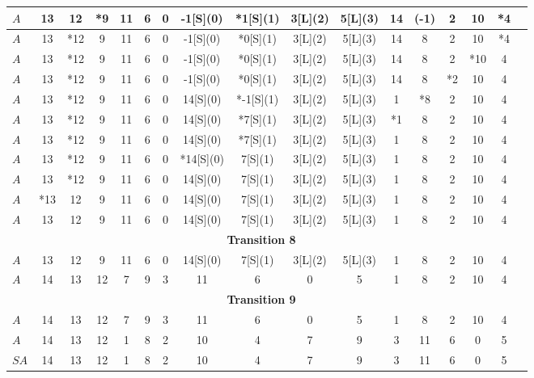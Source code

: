 \begin{center}
{\begin{tabular}{ | l | c | c | c | c | c | c | c | c | c | c | c | c | c | c | c | c | }
                $A$  & 13 & 12 & *9 & 11 & 6 & 0 & -1[S](0) & *1[S](1) & 3[L](2) & 5[L](3) & 14 & (-1) & 2 & 10 & *4  \\ \hline
                $A$  & 13 & *12 & 9 & 11 & 6 & 0 & -1[S](0) & *0[S](1) & 3[L](2) & 5[L](3) & 14 & 8 & 2 & 10 & *4  \\ \hline
                $A$  & 13 & *12 & 9 & 11 & 6 & 0 & -1[S](0) & *0[S](1) & 3[L](2) & 5[L](3) & 14 & 8 & 2 & *10 & 4  \\ \hline
                $A$  & 13 & *12 & 9 & 11 & 6 & 0 & -1[S](0) & *0[S](1) & 3[L](2) & 5[L](3) & 14 & 8 & *2 & 10 & 4  \\ \hline
                $A$  & 13 & *12 & 9 & 11 & 6 & 0 & 14[S](0) & *-1[S](1) & 3[L](2) & 5[L](3) & 1 & *8 & 2 & 10 & 4  \\ \hline
                $A$  & 13 & *12 & 9 & 11 & 6 & 0 & 14[S](0) & *7[S](1) & 3[L](2) & 5[L](3) & *1 & 8 & 2 & 10 & 4  \\ \hline
                $A$  & 13 & *12 & 9 & 11 & 6 & 0 & 14[S](0) & *7[S](1) & 3[L](2) & 5[L](3) & 1 & 8 & 2 & 10 & 4  \\ \hline
                $A$  & 13 & *12 & 9 & 11 & 6 & 0 & *14[S](0) & 7[S](1) & 3[L](2) & 5[L](3) & 1 & 8 & 2 & 10 & 4  \\ \hline
                $A$  & 13 & *12 & 9 & 11 & 6 & 0 & 14[S](0) & 7[S](1) & 3[L](2) & 5[L](3) & 1 & 8 & 2 & 10 & 4  \\ \hline
                $A$  & *13 & 12 & 9 & 11 & 6 & 0 & 14[S](0) & 7[S](1) & 3[L](2) & 5[L](3) & 1 & 8 & 2 & 10 & 4  \\ \hline
                $A$  & 13 & 12 & 9 & 11 & 6 & 0 & 14[S](0) & 7[S](1) & 3[L](2) & 5[L](3) & 1 & 8 & 2 & 10 & 4  \\ \hline
                \multicolumn{16}{c}{\textbf{Transition 8}}\\
                \hline
                $A$  & 13 & 12 & 9 & 11 & 6 & 0 & 14[S](0) & 7[S](1) & 3[L](2) & 5[L](3) & 1 & 8 & 2 & 10 & 4  \\ \hline
                $A$  & 14 & 13 & 12 & 7 & 9 & 3 & 11 & 6 & 0 & 5 & 1 & 8 & 2 & 10 & 4  \\ \hline
                \multicolumn{16}{c}{\textbf{Transition 9}}\\
                \hline
                $A$  & 14 & 13 & 12 & 7 & 9 & 3 & 11 & 6 & 0 & 5 & 1 & 8 & 2 & 10 & 4  \\ \hline
                $A$  & 14 & 13 & 12 & 1 & 8 & 2 & 10 & 4 & 7 & 9 & 3 & 11 & 6 & 0 & 5  \\ \hline \hline
                $SA$  & 14 & 13 & 12 & 1 & 8 & 2 & 10 & 4 & 7 & 9 & 3 & 11 & 6 & 0 & 5  \\ \hline
            \end{tabular}
            }
        \end{center}
